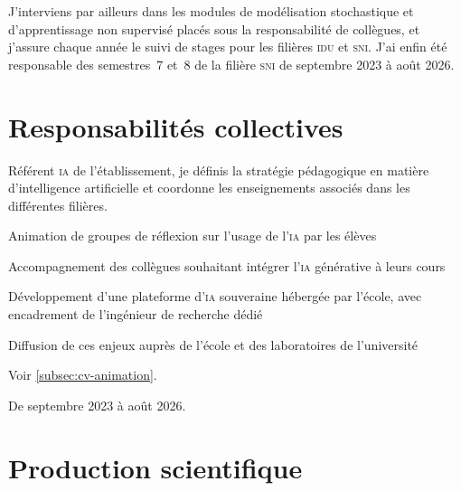 \medskip
\noindent J'interviens par ailleurs dans les modules de modélisation
stochastique et d'apprentissage non supervisé placés sous la responsabilité de
collègues, et j'assure chaque année le suivi de stages pour les filières
\textsc{idu} et \textsc{sni}. J'ai enfin été responsable des semestres~7 et~8
de la filière \textsc{sni} de septembre 2023 à août 2026.


\section{Responsabilités collectives}
\label{sec:cv-responsabilites}

Référent \textsc{ia} de l'établissement, je définis la stratégie pédagogique en
matière d'intelligence artificielle et coordonne les enseignements associés dans
les différentes filières.

\begin{cvfields}
  \item[Cadrage] Animation de groupes de réflexion sur l'usage de
    l'\textsc{ia} par les élèves
  \item[Formation] Accompagnement des collègues souhaitant intégrer
    l'\textsc{ia} générative à leurs cours
  \item[Plateforme] Développement d'une plateforme d'\textsc{ia} souveraine
    hébergée par l'école, avec encadrement de l'ingénieur de recherche dédié
  \item[Communication] Diffusion de ces enjeux auprès de l'école et des
    laboratoires de l'université
\end{cvfields}

Voir \cref{subsec:cv-animation}.

De septembre 2023 à août 2026.



\section{Production scientifique}
\label{sec:cv-production}

